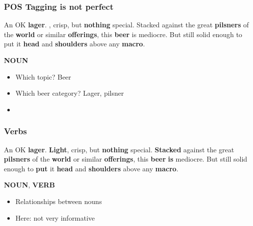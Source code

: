 \begin{frame}
    \frametitle{POS Tagging is not perfect}
\begin{spacing}{1.6}
    An OK \textbf{\textcolor{isered}{lager}}. \textbf{\mybox{\textcolor{isered}{Light}}}, crisp, but \textbf{\textcolor{isered}{nothing}} special. Stacked against the great \textbf{\textcolor{isered}{pilsners}} of the \textbf{\textcolor{isered}{world}} or similar \textbf{\textcolor{isered}{offerings}}, this \textbf{\textcolor{isered}{beer}} is mediocre. But still solid enough to put it \textbf{\textcolor{isered}{head}} and \textbf{\textcolor{isered}{shoulders}} above any \textbf{\textcolor{isered}{macro}}.
\end{spacing}

\vspace{-10pt}
\begin{flushright}
    \textbf{\textcolor{isered}{NOUN}}
\end{flushright}

\vspace{-10pt}
\begin{itemize}
\item Which topic? Beer
\item Which beer category? Lager, pilsner
\item \hyperlink{stats_nouns}{}
\end{itemize}

\end{frame}


\begin{frame}
    \frametitle{\textcolor{iseblue}{Verbs}}
    \label{review_verbs}
\begin{spacing}{1.6}
    An OK \textbf{\textcolor{isered}{lager}}. \textbf{\textcolor{isered}{Light}}, crisp, but \textbf{\textcolor{isered}{nothing}} special. \textbf{\textcolor{iseblue}{Stacked}} against the great \textbf{\textcolor{isered}{pilsners}} of the \textbf{\textcolor{isered}{world}} or similar \textbf{\textcolor{isered}{offerings}}, this \textbf{\textcolor{isered}{beer}} \textbf{\textcolor{iseblue}{is}} mediocre. But still solid enough to \textbf{\textcolor{iseblue}{put}} it \textbf{\textcolor{isered}{head}} and \textbf{\textcolor{isered}{shoulders}} above any \textbf{\textcolor{isered}{macro}}.
\end{spacing}

\vspace{-10pt}
\begin{flushright}
    \textbf{\textcolor{isered}{NOUN}}, \textbf{\textcolor{iseblue}{VERB}}
\end{flushright}

\begin{itemize}
\item Relationships between nouns $\; \;$\hyperlink{dependency_tree}{}
\item Here: not very informative
\end{itemize}

\end{frame}

